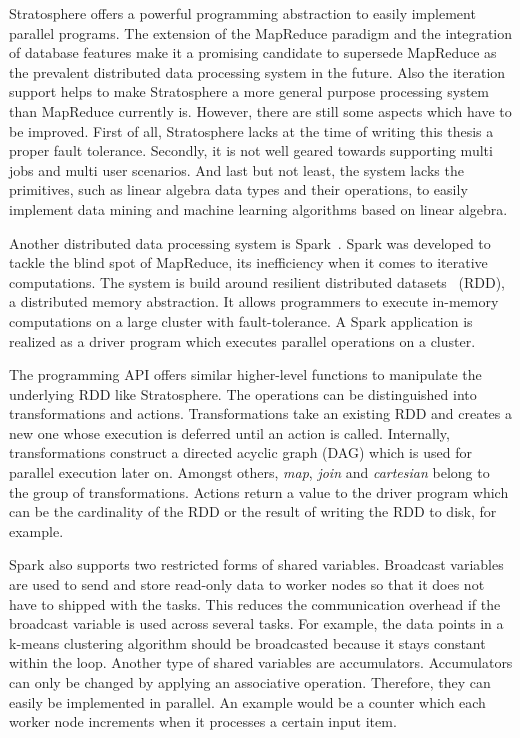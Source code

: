 Stratosphere offers a powerful programming abstraction to easily implement parallel programs.
The extension of the MapReduce paradigm and the integration of database features make it a promising candidate to supersede MapReduce as the prevalent distributed data processing system in the future.
Also the iteration support helps to make Stratosphere a more general purpose processing system than MapReduce currently is.
However, there are still some aspects which have to be improved.
First of all, Stratosphere lacks at the time of writing this thesis a proper fault tolerance.
Secondly, it is not well geared towards supporting multi jobs and multi user scenarios.
And last but not least, the system lacks the primitives, such as linear algebra data types and their operations, to easily implement data mining and machine learning algorithms based on linear algebra.

Another distributed data processing system is Spark~\cite{zaharia:2010a}.
Spark was developed to tackle the blind spot of MapReduce, its inefficiency when it comes to iterative computations.
The system is build around resilient distributed datasets~\cite{zaharia:2012a} (RDD), a distributed memory abstraction.
It allows programmers to execute in-memory computations on a large cluster with fault-tolerance.
A Spark application is realized as a driver program which executes parallel operations on a cluster.

The programming API offers similar higher-level functions to manipulate the underlying RDD like Stratosphere.
The operations can be distinguished into transformations and actions.
Transformations take an existing RDD and creates a new one whose execution is deferred until an action is called.
Internally, transformations construct a directed acyclic graph (DAG) which is used for parallel execution later on.
Amongst others, \emph{map}, \emph{join} and \emph{cartesian} belong to the group of transformations.
Actions return a value to the driver program which can be the cardinality of the RDD or the result of writing the RDD to disk, for example.

Spark also supports two restricted forms of shared variables.
Broadcast variables are used to send and store read-only data to worker nodes so that it does not have to shipped with the tasks.
This reduces the communication overhead if the broadcast variable is used across several tasks.
For example, the data points in a k-means clustering algorithm should be broadcasted because it stays constant within the loop.
Another type of shared variables are accumulators.
Accumulators can only be changed by applying an associative operation.
Therefore, they can easily be implemented in parallel.
An example would be a counter which each worker node increments when it processes a certain input item.

